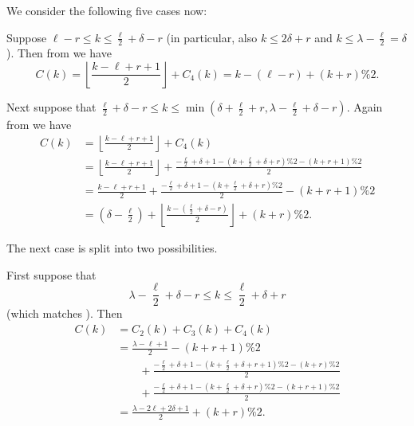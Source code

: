We consider the following five cases now:
\begin{enumerate}
  \ii Suppose $\ell - r \le k \le \frac{\ell}{2} + \delta - r$
  (in particular, also $k \le 2 \delta + r$ and $k \le \lambda - \frac{\ell}{2} = \delta$).
  Then from  we have
  \[ C(k) = \left\lfloor \frac{k-\ell+r+1}{2} \right\rfloor + C_4(k)
    = k - (\ell-r) + (k+r) \% 2. \]

  \ii Next suppose that
  $\frac{\ell}{2} + \delta - r \le k \le \min(\delta + \frac{\ell}{2} + r,
    \lambda - \frac{\ell}{2} + \delta - r)$.
  Again from  we have
  \begin{align*}
    C(k) &= \left\lfloor \frac{k - \ell + r + 1}{2} \right\rfloor + C_4(k) \\
    &= \left\lfloor \frac{k - \ell + r + 1}{2} \right\rfloor +
    \frac{-\frac{\ell}{2} + \delta + 1 - (k+\frac{\ell}{2}+\delta+r)\%2 - (k+r+1)\%2}{2} \\
    &= \frac{k - \ell + r + 1}{2} +
      \frac{-\frac{\ell}{2} + \delta + 1 - (k+\frac{\ell}{2}+\delta+r)\%2}{2} - (k+r+1)\%2 \\
    &= \left( \delta - \frac{\ell}{2}  \right)
    + \left\lfloor \frac{k - \left( \frac{\ell}{2} + \delta - r \right)}{2}  \right\rfloor
    + (k+r) \% 2.
  \end{align*}

  \ii The next case is split into two possibilities.
  \begin{itemize}
    \ii First suppose that
    \[ \lambda - \frac{\ell}{2} + \delta - r \le k \le \frac{\ell}{2} + \delta + r \]
    (which matches ).
    Then
    \begin{align*}
      C(k) &= C_2(k) + C_3(k) + C_4(k) \\
      &= \frac{\lambda-\ell+1}{2} - (k+r+1)\%2 \\
      &\qquad+ \frac{- \frac{\ell}{2} + \delta + 1 - (k+\frac{\ell}{2}+\delta+r+1)\%2 -(k+r)\%2}{2} \\
      &\qquad+ \frac{-\frac{\ell}{2} + \delta + 1 - (k+\frac{\ell}{2}+\delta+r)\%2 -(k+r+1)\%2}{2} \\
      &= \frac{\lambda-2\ell+2\delta+1}{2} + (k+r) \% 2.
    \end{align*}


\end{itemize}
\end{enumerate}
